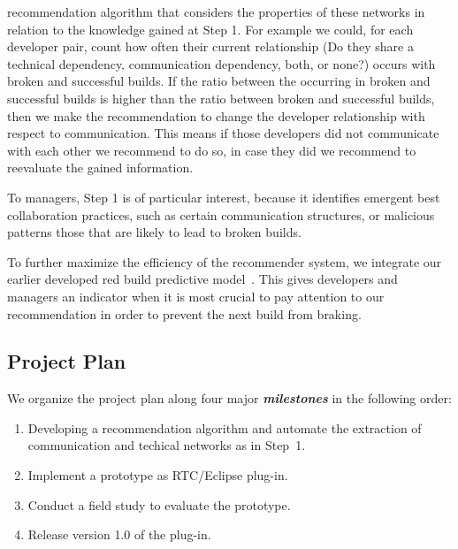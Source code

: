 \documentclass{sig-alternate}
\begin{document}
\begin{enumerate}
recommendation algorithm that considers the properties of these networks in
relation to the knowledge gained at Step 1. For example we could, for each
developer pair, count how often their current relationship (Do they share a
technical dependency, communication dependency, both, or none?) occurs with broken and successful builds. If the ratio between the occurring in broken and successful builds is higher than the ratio between  broken and successful builds, then we
make the recommendation to change the developer relationship with respect to communication. This means if those developers did not communicate with each other we recommend to do so, in case they did we
recommend to reevaluate the gained information.
\end{enumerate}\vspace{-2pt}
To managers, Step 1 is of particular interest, because it identifies emergent
best collaboration practices, such as certain communication structures, or malicious
patterns those that are likely to lead to broken builds.

To further maximize the efficiency of the recommender system, we integrate our earlier developed red build predictive model~\cite{wolf:tr2008}.
This gives developers and managers an indicator when it is most crucial to pay
attention to our recommendation in order to prevent the next build from braking.





\subsection{Project Plan}
We organize the project plan along four major \emph{\textbf{milestones}} in the
following order:
\begin{enumerate} \vspace{-4pt}
\item Developing a recommendation algorithm and automate the extraction of communication and
techical networks as in Step~1.
\vspace{-6pt}
\item Implement a prototype as RTC/Eclipse plug-in.\vspace{-6pt}
\item Conduct a field study to evaluate the prototype.\vspace{-6pt}
\item Release version 1.0 of the plug-in.
\end{enumerate}\vspace{-5pt}
\end{document}

